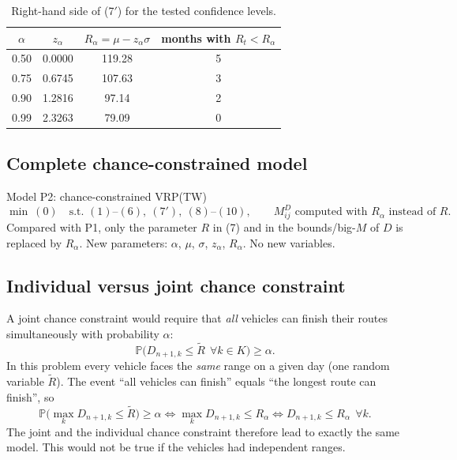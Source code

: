 \documentclass[11pt,a4paper]{article}
\theoremstyle{definition}
\begin{document}
\begin{table}[H]
\centering\small
\begin{tabular}{@{}cccc@{}}
\toprule
$\alpha$ & $z_\alpha$ & $R_\alpha=\mu-z_\alpha\sigma$ & months with $R_t<R_\alpha$\\
\midrule
0.50 & 0.0000 & 119.28 & 5 \\
0.75 & 0.6745 & 107.63 & 3 \\
0.90 & 1.2816 & 97.14 & 2 \\
0.99 & 2.3263 & 79.09 & 0 \\
\bottomrule
\end{tabular}
\caption{Right-hand side of (7$'$) for the tested confidence levels.}
\end{table}

\subsection{Complete chance-constrained model}
\begin{modelbox}{Model P2: chance-constrained VRP(TW)}
\[
\min\ (0)\quad\text{s.t. } (1)\text{--}(6),\ (7'),\ (8)\text{--}(10),\qquad M^D_{ij}\text{ computed with } R_\alpha \text{ instead of } R.
\]
Compared with P1, only the parameter $R$ in (7) and in the bounds/big-$M$ of $D$ is replaced by $R_\alpha$. New parameters: $\alpha$, $\mu$, $\sigma$, $z_\alpha$, $R_\alpha$. No new variables.
\end{modelbox}

\subsection{Individual versus joint chance constraint}
A joint chance constraint would require that \emph{all} vehicles can finish their routes simultaneously with probability $\alpha$:
\[
\mathbb P\big(D_{n+1,k}\le\tilde R\ \ \forall k\in K\big)\ge\alpha .
\]
In this problem every vehicle faces the \emph{same} range on a given day (one random variable $\tilde R$). The event ``all vehicles can finish'' equals ``the longest route can finish'', so
\[
\mathbb P\big(\max_k D_{n+1,k}\le\tilde R\big)\ge\alpha\iff \max_k D_{n+1,k}\le R_\alpha\iff D_{n+1,k}\le R_\alpha\ \ \forall k .
\]
The joint and the individual chance constraint therefore lead to exactly the same model. This would not be true if the vehicles had independent ranges.
\end{document}
